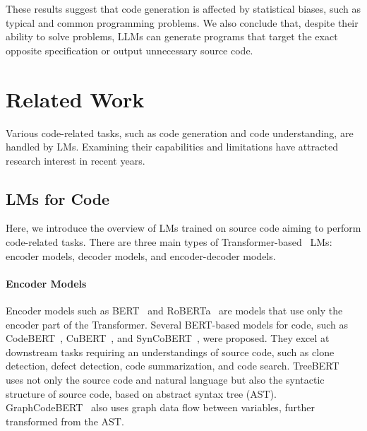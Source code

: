 \documentclass{article}
\begin{document}
These results suggest that code generation is affected by statistical biases, such as typical and common programming problems.
We also conclude that, despite their ability to solve problems, LLMs can generate programs that target the exact opposite specification or output unnecessary source code.









\section{Related Work}
\label{sec:related-work}

Various code-related tasks, such as code generation and code understanding, are handled by LMs.
Examining their capabilities and limitations have attracted research interest in recent years.



\subsection{LMs for Code}
\label{sec:related-work:lms}

Here, we introduce the overview of LMs trained on source code aiming to perform code-related tasks.
There are three main types of Transformer-based~\citep{vaswani2017transformer} LMs: encoder models, decoder models, and encoder-decoder models.



\paragraph{Encoder Models}

Encoder models such as BERT~\citep{devlin2019bert} and RoBERTa~\citep{liu2019roberta} are models that use only the encoder part of the Transformer.
Several BERT-based models for code, such as CodeBERT~\citep{feng2020codebert}, CuBERT~\citep{kanade2020cubert}, and SynCoBERT~\citep{wang2021syncobert}, were proposed.
They excel at downstream tasks requiring an understandings of source code, such as clone detection, defect detection, code summarization, and code search.
TreeBERT~\citep{jiang2021treebert} uses not only the source code and natural language but also the syntactic structure of source code, based on abstract syntax tree (AST).
GraphCodeBERT~\citep{guo2021graphcodebert} also uses graph data flow between variables, further transformed from the AST.
\end{document}
